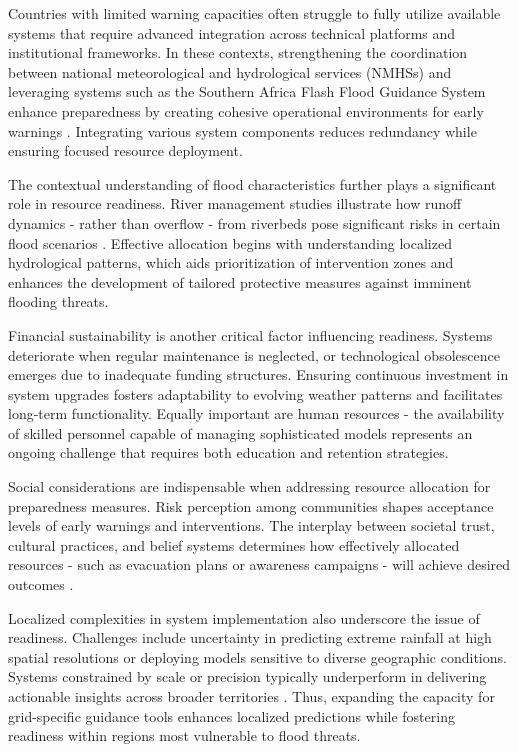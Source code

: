 Countries with limited warning capacities often struggle to fully utilize available systems that require advanced integration across technical platforms and institutional frameworks. In these contexts, strengthening the coordination between national meteorological and hydrological services (NMHSs) and leveraging systems such as the Southern Africa Flash Flood Guidance System enhance preparedness by creating cohesive operational environments for early warnings \citep{Jubach2016}. Integrating various system components reduces redundancy while ensuring focused resource deployment.

The contextual understanding of flood characteristics further plays a significant role in resource readiness. River management studies illustrate how runoff dynamics - rather than overflow - from riverbeds pose significant risks in certain flood scenarios \citep{Buzgaru2021}. Effective allocation begins with understanding localized hydrological patterns, which aids prioritization of intervention zones and enhances the development of tailored protective measures against imminent flooding threats.

Financial sustainability is another critical factor influencing readiness. Systems deteriorate when regular maintenance is neglected, or technological obsolescence emerges due to inadequate funding structures. Ensuring continuous investment in system upgrades fosters adaptability to evolving weather patterns and facilitates long-term functionality. Equally important are human resources - the availability of skilled personnel capable of managing sophisticated models represents an ongoing challenge that requires both education and retention strategies.

Social considerations are indispensable when addressing resource allocation for preparedness measures. Risk perception among communities shapes acceptance levels of early warnings and interventions. The interplay between societal trust, cultural practices, and belief systems determines how effectively allocated resources - such as evacuation plans or awareness campaigns - will achieve desired outcomes \citep{Msigwa2024}.

Localized complexities in system implementation also underscore the issue of readiness. Challenges include uncertainty in predicting extreme rainfall at high spatial resolutions or deploying models sensitive to diverse geographic conditions. Systems constrained by scale or precision typically underperform in delivering actionable insights across broader territories \citep{Naulin2013}\citep{Yang2022}. Thus, expanding the capacity for grid-specific guidance tools enhances localized predictions while fostering readiness within regions most vulnerable to flood threats.

